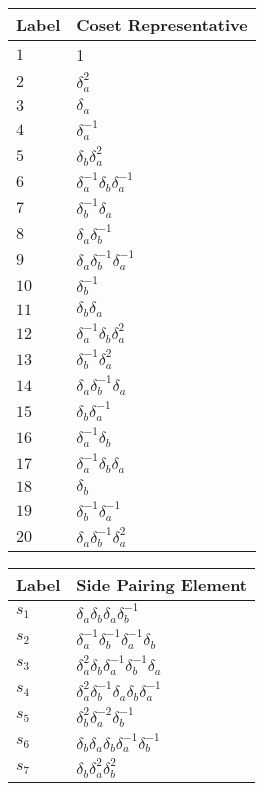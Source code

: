 \documentclass{article}
\begin{document}
\begin{center}
\begin{tabular}{ll}
\toprule
Label & Coset Representative\\
\midrule
$1$ & 1 \\
$2$ & $\delta_a^{2}$ \\
$3$ & $\delta_a^{}$ \\
$4$ & $\delta_a^{-1}$ \\
$5$ & $\delta_b^{}\delta_a^{2}$ \\
$6$ & $\delta_a^{-1}\delta_b^{}\delta_a^{-1}$ \\
$7$ & $\delta_b^{-1}\delta_a^{}$ \\
$8$ & $\delta_a^{}\delta_b^{-1}$ \\
$9$ & $\delta_a^{}\delta_b^{-1}\delta_a^{-1}$ \\
$10$ & $\delta_b^{-1}$ \\
$11$ & $\delta_b^{}\delta_a^{}$ \\
$12$ & $\delta_a^{-1}\delta_b^{}\delta_a^{2}$ \\
$13$ & $\delta_b^{-1}\delta_a^{2}$ \\
$14$ & $\delta_a^{}\delta_b^{-1}\delta_a^{}$ \\
$15$ & $\delta_b^{}\delta_a^{-1}$ \\
$16$ & $\delta_a^{-1}\delta_b^{}$ \\
$17$ & $\delta_a^{-1}\delta_b^{}\delta_a^{}$ \\
$18$ & $\delta_b^{}$ \\
$19$ & $\delta_b^{-1}\delta_a^{-1}$ \\
$20$ & $\delta_a^{}\delta_b^{-1}\delta_a^{2}$ \\
\bottomrule
\end{tabular}
\hfill
\begin{tabular}{ll}
\toprule
Label & Side Pairing Element\\
\midrule
$s_{1}$ & $\delta_a^{}\delta_b^{}\delta_a^{}\delta_b^{-1}$ \\
$s_{2}$ & $\delta_a^{-1}\delta_b^{-1}\delta_a^{-1}\delta_b^{}$ \\
$s_{3}$ & $\delta_a^{2}\delta_b^{}\delta_a^{-1}\delta_b^{-1}\delta_a^{}$ \\
$s_{4}$ & $\delta_a^{2}\delta_b^{-1}\delta_a^{}\delta_b^{}\delta_a^{-1}$ \\
$s_{5}$ & $\delta_b^{2}\delta_a^{-2}\delta_b^{-1}$ \\
$s_{6}$ & $\delta_b^{}\delta_a^{}\delta_b^{}\delta_a^{-1}\delta_b^{-1}$ \\
$s_{7}$ & $\delta_b^{}\delta_a^{2}\delta_b^{2}$ \\

\end{tabular}
\end{center}
\end{document}
